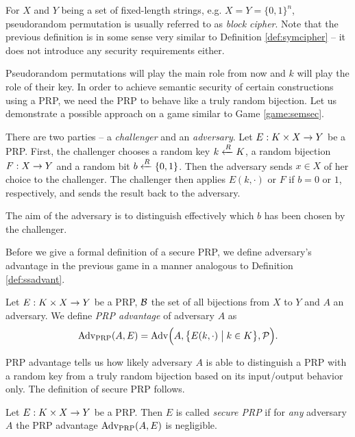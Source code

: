 \begin{note}
	For $X$ and $Y$ being a set of fixed-length strings, e.g. $X = Y = \{0,1\}^n$, pseudorandom permutation is usually referred to as {\em block cipher}. Note that the previous definition is in some sense very similar to Definition \ref{def:symcipher} -- it does not introduce any security requirements either.
\end{note}

Pseudorandom permutations will play the main role from now and $k$ will play the role of their key. In order to achieve semantic security of certain constructions using a PRP, we need the PRP to behave like a truly random bijection. Let us demonstrate a possible approach on a game similar to Game \ref{game:semsec}.

\begin{game}
\label{game:prp}
	There are two parties -- a {\em challenger} and an {\em adversary}. Let $E:K\times X\rightarrow Y$ be a PRP. First, the challenger chooses a random key $k\xleftarrow{R} K$, a random bijection $F:X\rightarrow Y$ and a random bit $b\xleftarrow{R}\{0,1\}$. Then the adversary sends $x\in X$ of her choice to the challenger. The challenger then applies $E(k,\cdot)$ or $F$ if $b=0$ or $1$, respectively, and sends the result back to the adversary.
	
	The aim of the adversary is to distinguish effectively which $b$ has been chosen by the challenger.
\end{game}

Before we give a formal definition of a secure PRP, we define adversary's advantage in the previous game in a manner analogous to Definition \ref{def:ssadvant}.

\begin{defn}
\label{def:prpadvant}
	Let $E: K\times X\rightarrow Y$ be a PRP, $\cal B$ the set of all bijections from $X$ to $Y$ and $A$ an adversary. We define {\em PRP advantage} of adversary $A$ as
	\[
		\operatorname*{Adv_{PRP}}(A,E) = \operatorname*{Adv}\Bigl(A,\bigl\{E(k,\cdot)\bigm|k\in K\bigr\},{\cal P}\Bigr) .
	\]
\end{defn}

PRP advantage tells us how likely adversary $A$ is able to distinguish a PRP with a random key from a truly random bijection based on its input/output behavior only. The definition of secure PRP follows.

\begin{defn}
\label{def:secprp}
	Let $E: K\times X\rightarrow Y$ be a PRP. Then $E$ is called {\em secure PRP} if for {\em any} adversary $A$ the PRP advantage $\operatorname*{Adv_{PRP}}(A,E)$ is negligible.   %
\end{defn}

